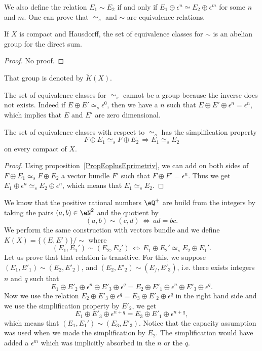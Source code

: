 We also define the relation $E_1\sim E_2$ if and only if $E_1\oplus\epsilon^n\simeq E_2\oplus\epsilon^m$ for some $n$ and $m$. One can prove that $\simeq_s$ and $\sim$ are equivalence relations.

\begin{proposition}
If $X$ is compact and Hausdorff, the set of equivalence classes for $\sim$ is an abelian group for the direct sum.
\end{proposition}

\begin{proof}
No proof.
\end{proof}
That group is denoted by $\tilde K(X)$.

The set of equivalence classes for $\simeq_s$ cannot be a group because the inverse does not exists. Indeed if $E\oplus E'\simeq_s\epsilon^0$, then we have a $n$ such that $E\oplus E'\oplus\epsilon^n=\epsilon^n$, which implies that $E$ and $E'$ are zero dimensional.

\begin{proposition}
The set of equivalence classes with respect to $\simeq_s$ has the simplification property
\begin{equation}
F\oplus E_1\simeq_s F\oplus E_2\,\Rightarrow E_1\simeq_s E_2
\end{equation}
on every compact of $X$.
\end{proposition}

\begin{proof}
Using proposition~\ref{PropEoplusEprimetriv}, we can add on both sides of $F\oplus E_1\simeq_s F\oplus E_2$ a vector bundle $F'$ such that $F\oplus F'=\epsilon^n$. Thus we get $E_1\oplus\epsilon^n\simeq_s E_2\oplus\epsilon^n$, which means that $E_1\simeq_s E_2$.
\end{proof}

We know that the positive rational numbers $\eQ^+$ are build from the integers by taking the pairs $(a,b)\in\eN^2$ and the quotient by
\[
  (a,b)\sim(c,d)\,\Leftrightarrow\, ad=bc.
\]
We perform the same construction with vectors bundle and we define $K(X)=\{ (E,E') \}/\sim$ where
\begin{equation}
(E_1,E_1')\sim (E_2,E_2')\,\Leftrightarrow\, E_1\oplus E_2'\simeq_s E_2\oplus E_1'.
\end{equation}
Let us prove that that relation is transitive. For this, we suppose $(E_1,E'_1)\sim (E_2,E'_2)$, and $(E_2,E'_2)\sim(E_/,E'_3)$, i.e. there exists integers $n$ and $q$ such that
\[
E_1\oplus E'_2\oplus\epsilon^n\oplus E'_3\oplus\epsilon^q	=E_2\oplus E'_1\oplus\epsilon^n\oplus E'_3\oplus\epsilon^q.
\]
Now we use the relation $E_2\oplus E'_3\oplus\epsilon^q=E_3\oplus E'_2\oplus\epsilon^q$ in the right hand side and we use the simplification property by $E'_2$, we get
\[
  E_1\oplus E'_3\oplus\epsilon^{n+q}=E_3\oplus E'_1\oplus\epsilon^{n+q},
\]
which means that $(E_1,E_1')\sim (E_3,E'_3)$. Notice that the capacity assumption was used when we made the simplification by $E_2$. The simplification would have added a $\epsilon^m$ which was implicitly absorbed in the $n$ or the $q$.

